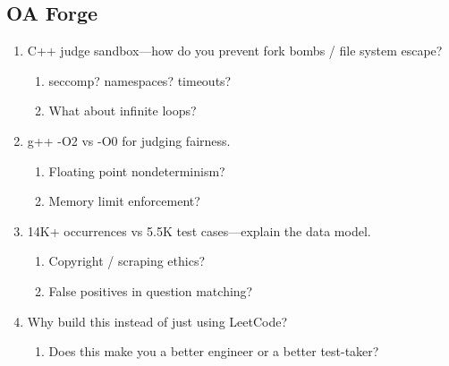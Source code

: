 \documentclass[9pt,a4paper]{article}
\begin{document}
\subsection{OA Forge}
\begin{enumerate}[label=\textbf{Q\arabic*:}, leftmargin=*]
  \item C++ judge sandbox---how do you prevent fork bombs / file system escape?
  \begin{enumerate}[label=\textit{FU\arabic*:}, leftmargin=2em]
    \item seccomp? namespaces? timeouts?
    \item What about infinite loops?
  \end{enumerate}
  \item g++ -O2 vs -O0 for judging fairness.
  \begin{enumerate}[label=\textit{FU\arabic*:}, leftmargin=2em]
    \item Floating point nondeterminism?
    \item Memory limit enforcement?
  \end{enumerate}
  \item 14K+ occurrences vs 5.5K test cases---explain the data model.
  \begin{enumerate}[label=\textit{FU\arabic*:}, leftmargin=2em]
    \item Copyright / scraping ethics?
    \item False positives in question matching?
  \end{enumerate}
  \item Why build this instead of just using LeetCode?
  \begin{enumerate}[label=\textit{FU\arabic*:}, leftmargin=2em]
    \item Does this make you a better engineer or a better test-taker?
  \end{enumerate}
\end{enumerate}
\end{document}
